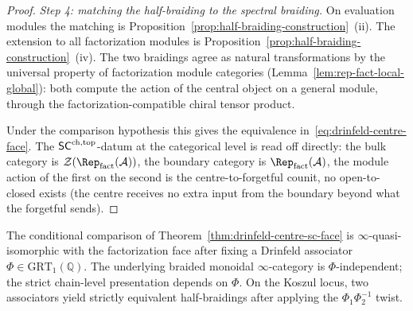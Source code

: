 \begin{proof}
\emph{Step 4: matching the half-braiding to the spectral braiding.}
On evaluation modules the matching is
Proposition~\ref{prop:half-braiding-construction}~(ii). The
extension to all factorization modules is
Proposition~\ref{prop:half-braiding-construction}~(iv). The two
braidings agree as natural transformations
by the universal property of factorization module categories
(Lemma~\ref{lem:rep-fact-local-global}): both compute the action of
the central object on a general module, through the
factorization-compatible chiral tensor product.

Under the comparison hypothesis this gives the equivalence
in~\eqref{eq:drinfeld-centre-face}.
The $\mathsf{SC}^{\mathrm{ch},\mathrm{top}}$-datum at the categorical level is read off directly:
the bulk category is $\cZ(\Rep_{\mathrm{fact}}(\cA))$, the boundary
category is $\Rep_{\mathrm{fact}}(\cA)$, the module action of the
first on the second is the centre-to-forgetful counit, no open-to-closed
exists (the centre receives no extra input from the boundary beyond
what the forgetful sends).
\end{proof}

\begin{remark}\label{rem:face-6-associator}
The conditional comparison of
Theorem~\ref{thm:drinfeld-centre-sc-face} is
$\infty$-quasi-isomorphic with the factorization face after fixing a
Drinfeld associator $\Phi\in\mathrm{GRT}_1(\mathbb{Q})$. The underlying
braided monoidal $\infty$-category is $\Phi$-independent; the strict
chain-level presentation depends on $\Phi$. On the Koszul locus, two
associators yield strictly equivalent half-braidings after applying
the $\Phi_1\Phi_2^{-1}$ twist.
\end{remark}

